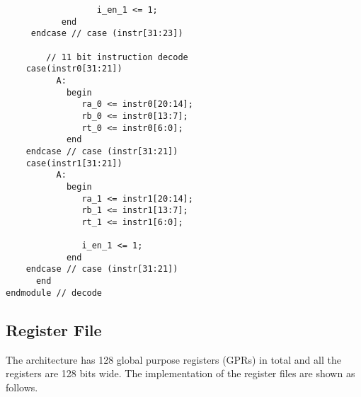 \documentclass[preprint,authoryear,12pt]{elsarticle}
\begin{document}
\begin{verbatim}
                  i_en_1 <= 1;
	       end
	 endcase // case (instr[31:23])

        // 11 bit instruction decode	
	case(instr0[31:21])
          A:
            begin
               ra_0 <= instr0[20:14];
               rb_0 <= instr0[13:7];
               rt_0 <= instr0[6:0];
            end
	endcase // case (instr[31:21])
	case(instr1[31:21])
          A:
            begin
               ra_1 <= instr1[20:14];
               rb_1 <= instr1[13:7];
               rt_1 <= instr1[6:0];

               i_en_1 <= 1;
            end
	endcase // case (instr[31:21])
      end
endmodule // decode

\end{verbatim}


\subsection{Register File}

The architecture has 128 global purpose registers (GPRs) in total and
all the registers are 128 bits wide. The implementation of the
register files are shown as follows.
\end{document}
